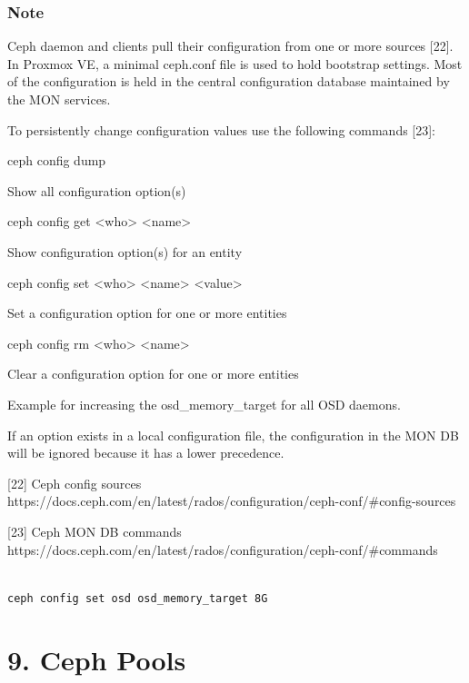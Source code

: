 \subsubsection{Note}

Ceph daemon and clients pull their configuration from one or more sources [22]. In Proxmox VE, a minimal ceph.conf file is used to hold bootstrap settings. Most of the configuration is held in the central configuration database maintained by the MON services.

To persistently change configuration values use the following commands [23]:

ceph config dump

Show all configuration option(s)

ceph config get <who> <name>

Show configuration option(s) for an entity

ceph config set <who> <name> <value>

Set a configuration option for one or more entities

ceph config rm <who> <name>

Clear a configuration option for one or more entities

Example for increasing the osd_memory_target for all OSD daemons.

If an option exists in a local configuration file, the configuration in the MON DB will be ignored because it has a lower precedence.

[22] Ceph config sources https://docs.ceph.com/en/latest/rados/configuration/ceph-conf/#config-sources

[23] Ceph MON DB commands https://docs.ceph.com/en/latest/rados/configuration/ceph-conf/#commands

\begin{lstlisting}

ceph config set osd osd_memory_target 8G

\end{lstlisting}

\begin{table}[htbp]

\centering

\begin{tabular}

\end{tabular}

\end{table}


\section{9. Ceph Pools}

